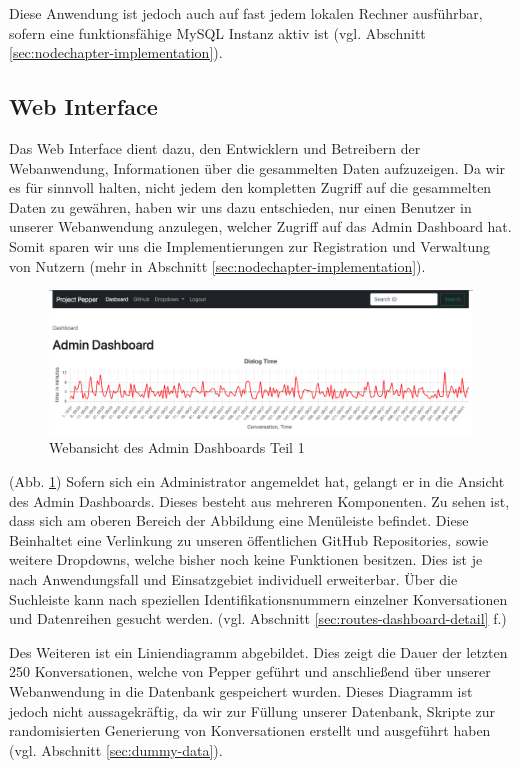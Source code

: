 Diese Anwendung ist jedoch auch auf fast jedem lokalen Rechner ausführbar, sofern eine funktionsfähige MySQL Instanz aktiv ist (vgl. Abschnitt \ref{sec:nodechapter-implementation}).

\subsection{Web Interface}
\label{sec:nodechapter-web-interface}
Das Web Interface dient dazu, den Entwicklern und Betreibern der Webanwendung, Informationen über die gesammelten Daten aufzuzeigen. Da wir es für sinnvoll halten, nicht jedem den kompletten Zugriff auf die gesammelten Daten zu gewähren, haben wir uns dazu entschieden, nur einen Benutzer in unserer Webanwendung anzulegen, welcher Zugriff auf das Admin Dashboard hat. Somit sparen wir uns die Implementierungen zur Registration und Verwaltung von Nutzern (mehr in Abschnitt \ref{sec:nodechapter-implementation}).\\


\begin{figure}[H]
    \includegraphics[width=\textwidth]{Figures/NodeChapter/adminDashboard1.png}
    \caption{Webansicht des Admin Dashboards Teil 1}
    \label{fig:admindashboard1}
    \centering
\end{figure}

(Abb. \ref{fig:admindashboard1}) Sofern sich ein Administrator angemeldet hat, gelangt er in die Ansicht des Admin Dashboards. Dieses besteht aus mehreren Komponenten. Zu sehen ist, dass sich am oberen Bereich der Abbildung eine Menüleiste befindet. Diese Beinhaltet eine Verlinkung zu unseren öffentlichen GitHub Repositories, sowie weitere Dropdowns, welche bisher noch keine Funktionen besitzen. Dies ist je nach Anwendungsfall und Einsatzgebiet individuell erweiterbar. Über die Suchleiste kann nach speziellen Identifikationsnummern einzelner Konversationen und Datenreihen gesucht werden. (vgl. Abschnitt \ref{sec:routes-dashboard-detail} f.)

Des Weiteren ist ein Liniendiagramm abgebildet. Dies zeigt die Dauer der letzten 250 Konversationen, welche von Pepper geführt und anschließend über unserer Webanwendung in die Datenbank gespeichert wurden. Dieses Diagramm ist jedoch nicht aussagekräftig, da wir zur Füllung unserer Datenbank, Skripte zur randomisierten Generierung von Konversationen erstellt und ausgeführt haben (vgl. Abschnitt \ref{sec:dummy-data}).

